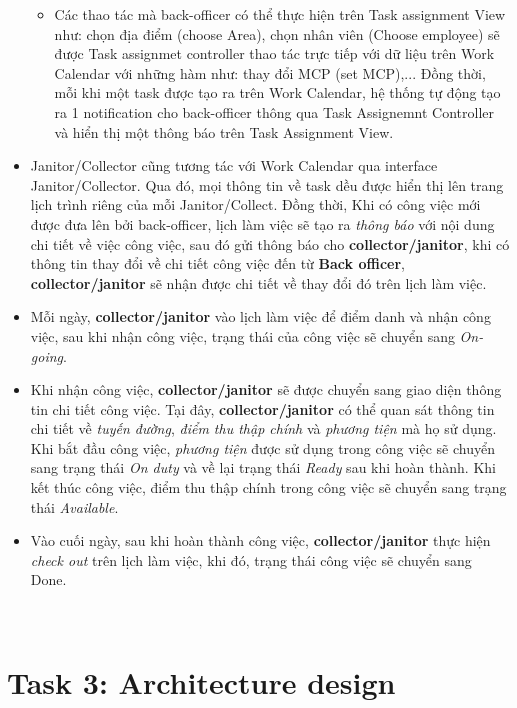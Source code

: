 \documentclass[a4paper]{article}
\begin{document}
\begin{itemize}
\begin{itemize}
        \item Các thao tác mà back-officer có thể thực hiện trên Task assignment View như: chọn địa điểm (choose Area), chọn nhân viên (Choose employee) sẽ được Task assignmet controller thao tác trực tiếp với dữ liệu trên Work Calendar với những hàm như: thay đổi MCP (set MCP),... Đồng thời, mỗi khi một task được tạo ra trên Work Calendar, hệ thống tự động tạo ra 1 notification cho back-officer thông qua Task Assignemnt Controller và hiển thị một thông báo trên Task Assignment View.
    \end{itemize}
    \item Janitor/Collector cũng tương tác với Work Calendar qua interface Janitor/Collector. Qua đó, mọi thông tin về task dều được hiển thị lên trang lịch trình riêng của mỗi Janitor/Collect. Đồng thời, Khi có công việc mới được đưa lên bởi back-officer, lịch làm việc sẽ tạo ra \textit{thông báo} với nội dung chi tiết về việc công việc, sau đó gửi thông báo cho \textbf{collector/janitor}, khi có thông tin thay đổi về chi tiết công việc đến từ \textbf{Back officer}, \textbf{collector/janitor} sẽ nhận được chi tiết về thay đổi đó trên lịch làm việc.
    \item Mỗi ngày, \textbf{collector/janitor} vào lịch làm việc để điểm danh và nhận công việc, sau khi nhận công việc, trạng thái của công việc sẽ chuyển sang \textit{On-going}.
    \item Khi nhận công việc, \textbf{collector/janitor} sẽ được chuyển sang giao diện thông tin chi tiết công việc. Tại đây, \textbf{collector/janitor}  có thể quan sát thông tin chi tiết về \textit{tuyến đường}, \textit{điểm thu thập chính} và \textit{phương tiện} mà họ sử dụng. Khi bắt đầu công việc, \textit{phương tiện} được sử dụng trong công việc sẽ chuyển sang trạng thái \textit{On duty} và về lại trạng thái \textit{Ready} sau khi hoàn thành.  Khi kết thúc công việc, điểm thu thập chính trong công việc sẽ chuyển sang trạng thái \textit{Available}.
    \item  Vào cuối ngày, sau khi hoàn thành công việc, \textbf{collector/janitor} thực hiện \textit{check out} trên lịch làm việc, khi đó, trạng thái công việc sẽ chuyển sang Done.
\end{itemize}
\\
\section{Task 3: Architecture design}
\end{document}
